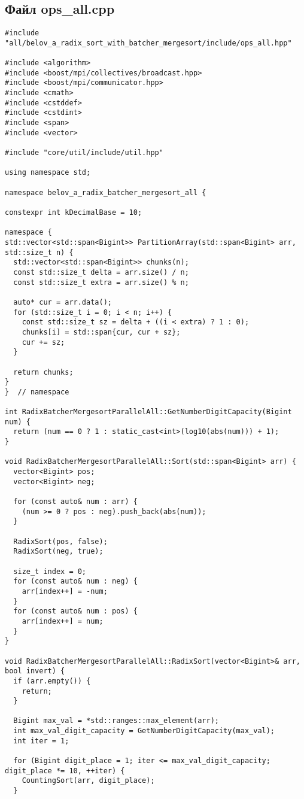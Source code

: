 \documentclass[a4paper,12pt]{article}
\begin{document}
\subsection*{Файл ops\_all.cpp}
\begin{lstlisting}
#include "all/belov_a_radix_sort_with_batcher_mergesort/include/ops_all.hpp"

#include <algorithm>
#include <boost/mpi/collectives/broadcast.hpp>
#include <boost/mpi/communicator.hpp>
#include <cmath>
#include <cstddef>
#include <cstdint>
#include <span>
#include <vector>

#include "core/util/include/util.hpp"

using namespace std;

namespace belov_a_radix_batcher_mergesort_all {

constexpr int kDecimalBase = 10;

namespace {
std::vector<std::span<Bigint>> PartitionArray(std::span<Bigint> arr, std::size_t n) {
  std::vector<std::span<Bigint>> chunks(n);
  const std::size_t delta = arr.size() / n;
  const std::size_t extra = arr.size() % n;

  auto* cur = arr.data();
  for (std::size_t i = 0; i < n; i++) {
    const std::size_t sz = delta + ((i < extra) ? 1 : 0);
    chunks[i] = std::span{cur, cur + sz};
    cur += sz;
  }

  return chunks;
}
}  // namespace

int RadixBatcherMergesortParallelAll::GetNumberDigitCapacity(Bigint num) {
  return (num == 0 ? 1 : static_cast<int>(log10(abs(num))) + 1);
}

void RadixBatcherMergesortParallelAll::Sort(std::span<Bigint> arr) {
  vector<Bigint> pos;
  vector<Bigint> neg;

  for (const auto& num : arr) {
    (num >= 0 ? pos : neg).push_back(abs(num));
  }

  RadixSort(pos, false);
  RadixSort(neg, true);

  size_t index = 0;
  for (const auto& num : neg) {
    arr[index++] = -num;
  }
  for (const auto& num : pos) {
    arr[index++] = num;
  }
}

void RadixBatcherMergesortParallelAll::RadixSort(vector<Bigint>& arr, bool invert) {
  if (arr.empty()) {
    return;
  }

  Bigint max_val = *std::ranges::max_element(arr);
  int max_val_digit_capacity = GetNumberDigitCapacity(max_val);
  int iter = 1;

  for (Bigint digit_place = 1; iter <= max_val_digit_capacity; digit_place *= 10, ++iter) {
    CountingSort(arr, digit_place);
  }


\end{lstlisting}
\end{document}
